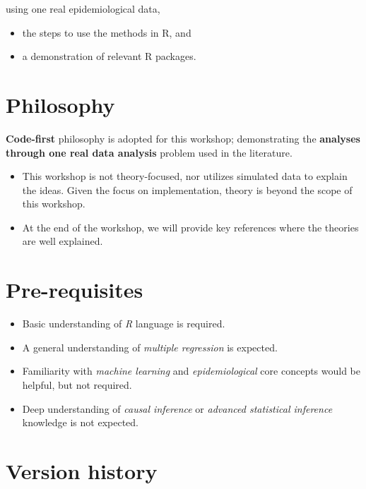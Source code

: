 \documentclass[
]{book}
\providecommand{\tightlist}{%
  \setlength{\itemsep}{0pt}\setlength{\parskip}{0pt}}
\begin{document}
using one real epidemiological data,

\begin{itemize}
\tightlist
\item
  the steps to use the methods in R, and
\item
  a demonstration of relevant R packages.~
\end{itemize}

\hypertarget{philosophy}{%
\section*{Philosophy}\label{philosophy}}

\textbf{Code-first} philosophy is adopted for this workshop; demonstrating the \textbf{analyses through one real data analysis} problem used in the literature.

\begin{itemize}
\tightlist
\item
  This workshop is not theory-focused, nor utilizes simulated data to explain the ideas. Given the focus on implementation, theory is beyond the scope of this workshop.
\item
  At the end of the workshop, we will provide key references where the theories are well explained.
\end{itemize}

\hypertarget{pre-requisites}{%
\section*{Pre-requisites}\label{pre-requisites}}

\begin{itemize}
\tightlist
\item
  Basic understanding of \emph{R} language is required.
\item
  A general understanding of \emph{multiple regression} is expected.
\item
  Familiarity with \emph{machine learning} and \emph{epidemiological} core concepts would be helpful, but not required.
\item
  Deep understanding of \emph{causal inference} or \emph{advanced statistical inference} knowledge is not expected.
\end{itemize}

\hypertarget{version-history}{%
\section*{Version history}\label{version-history}}
\end{document}

